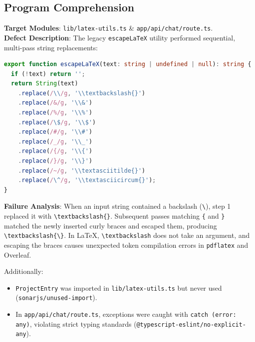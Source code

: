 \documentclass[12pt,a4paper]{article}
\begin{document}
\subsection{Program Comprehension}
\textbf{Target Modules}: \texttt{lib/latex-utils.ts} \& \texttt{app/api/chat/route.ts}.\\
\textbf{Defect Description}: The legacy \texttt{escapeLaTeX} utility performed sequential, multi-pass string replacements:
\begin{lstlisting}[language=TypeScript, caption={Flawed Multi-Pass Escaping in \texttt{lib/latex-utils.ts}}, label={lst:prev_bad}]
export function escapeLaTeX(text: string | undefined | null): string {
  if (!text) return '';
  return String(text)
    .replace(/\\/g, '\\textbackslash{}')
    .replace(/&/g, '\\&')
    .replace(/%/g, '\\%')
    .replace(/\$/g, '\\$')
    .replace(/#/g, '\\#')
    .replace(/_/g, '\\_')
    .replace(/{/g, '\\{')
    .replace(/}/g, '\\}')
    .replace(/~/g, '\\textasciitilde{}')
    .replace(/\^/g, '\\textasciicircum{}');
}
\end{lstlisting}

\textbf{Failure Analysis}: When an input string contained a backslash (\texttt{\textbackslash}), step 1 replaced it with \texttt{\textbackslash textbackslash\{\}}. Subsequent passes matching \texttt{\{} and \texttt{\}} matched the newly inserted curly braces and escaped them, producing \texttt{\textbackslash textbackslash\{\textbackslash\}}. In LaTeX, \texttt{\textbackslash textbackslash} does not take an argument, and escaping the braces causes unexpected token compilation errors in \texttt{pdflatex} and Overleaf.

Additionally:
\begin{itemize}[noitemsep]
    \item \texttt{ProjectEntry} was imported in \texttt{lib/latex-utils.ts} but never used (\texttt{sonarjs/unused-import}).
    \item In \texttt{app/api/chat/route.ts}, exceptions were caught with \texttt{catch (error: any)}, violating strict typing standards (\texttt{@typescript-eslint/no-explicit-any}).
\end{itemize}
\end{document}
